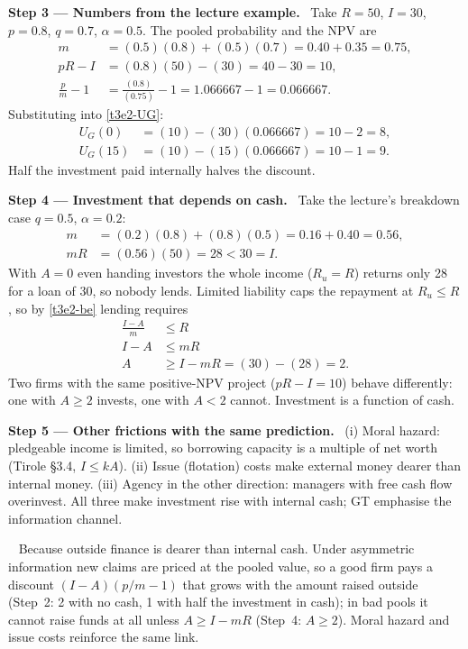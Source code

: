 \documentclass[11pt,a4paper]{article}
\newcommand{\step}[2]{\par\medskip\noindent\textbf{Step #1 --- #2.}~}
\newcommand{\answer}[1]{\par\smallskip\noindent\fbox{\textbf{Answer #1.}}~}
\begin{document}
\step{3}{Numbers from the lecture example} Take $R=50$, $I=30$, $p=0.8$, $q=0.7$, $\alpha=0.5$. The pooled probability and the NPV are
\begin{align}
  m &= (0.5)(0.8)+(0.5)(0.7) = 0.40+0.35 = 0.75, \nonumber\\
  pR-I &= (0.8)(50)-(30) = 40-30 = 10, \nonumber\\
  \frac{p}{m}-1 &= \frac{(0.8)}{(0.75)}-1 = 1.066667-1 = 0.066667. \nonumber
\end{align}
Substituting into \eqref{t3e2-UG}:
\begin{align}
  U_G(0) &= (10)-(30)(0.066667) = 10-2 = 8, \nonumber\\
  U_G(15) &= (10)-(15)(0.066667) = 10-1 = 9. \nonumber
\end{align}
Half the investment paid internally halves the discount.

\step{4}{Investment that depends on cash} Take the lecture's breakdown case $q=0.5$, $\alpha=0.2$:
\begin{align}
  m &= (0.2)(0.8)+(0.8)(0.5) = 0.16+0.40 = 0.56, \nonumber\\
  mR &= (0.56)(50) = 28 < 30 = I. \nonumber
\end{align}
With $A=0$ even handing investors the whole income ($R_u=R$) returns only 28 for a loan of 30, so nobody lends. Limited liability caps the repayment at $R_u\le R$, so by \eqref{t3e2-be} lending requires
\begin{align}
  \frac{I-A}{m} &\le R \nonumber\\
  I-A &\le mR \nonumber\\
  A &\ge I-mR = (30)-(28) = 2. \label{t3e2-Amin}
\end{align}
Two firms with the same positive-NPV project ($pR-I=10$) behave differently: one with $A\ge 2$ invests, one with $A<2$ cannot. Investment is a function of cash.

\step{5}{Other frictions with the same prediction} (i) Moral hazard: pledgeable income is limited, so borrowing capacity is a multiple of net worth (Tirole \S3.4, $I\le kA$). (ii) Issue (flotation) costs make external money dearer than internal money. (iii) Agency in the other direction: managers with free cash flow overinvest. All three make investment rise with internal cash; GT emphasise the information channel.

\answer{(a)} Because outside finance is dearer than internal cash. Under asymmetric information new claims are priced at the pooled value, so a good firm pays a discount $(I-A)(p/m-1)$ that grows with the amount raised outside (Step~2: 2 with no cash, 1 with half the investment in cash); in bad pools it cannot raise funds at all unless $A\ge I-mR$ (Step~4: $A\ge2$). Moral hazard and issue costs reinforce the same link.
\end{document}
